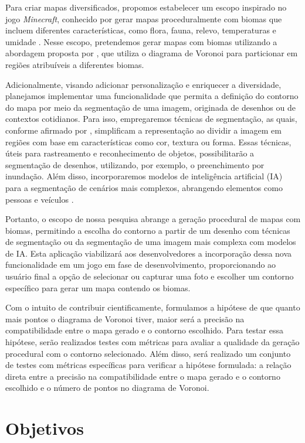 Para criar mapas diversificados, propomos estabelecer um escopo inspirado no jogo \textit{Minecraft}, conhecido por gerar mapas proceduralmente com biomas que incluem diferentes características, como flora, fauna, relevo, temperaturas e umidade \cite{mojang}. Nesse escopo, pretendemos gerar mapas com biomas utilizando a abordagem proposta por , que utiliza o diagrama de Voronoi para particionar em regiões atribuíveis a diferentes biomas.

Adicionalmente, visando adicionar personalização e enriquecer a diversidade, planejamos implementar uma funcionalidade que permita a definição do contorno do mapa por meio da segmentação de uma imagem, originada de desenhos ou de contextos cotidianos. Para isso, empregaremos técnicas de segmentação, as quais, conforme afirmado por , simplificam a representação ao dividir a imagem em regiões com base em características como cor, textura ou forma. Essas técnicas, úteis para rastreamento e reconhecimento de objetos, possibilitarão a segmentação de desenhos, utilizando, por exemplo, o preenchimento por inundação. Além disso, incorporaremos modelos de inteligência artificial (IA) para a segmentação de cenários mais complexos, abrangendo elementos como pessoas e veículos \cite{saiwa, OpenCVFloodFill, dp_semantic_segmantation}.

Portanto, o escopo de nossa pesquisa abrange a geração procedural de mapas com biomas, permitindo a escolha do contorno a partir de um desenho com técnicas de segmentação ou da segmentação de uma imagem mais complexa com modelos de IA. Esta aplicação viabilizará aos desenvolvedores a incorporação dessa nova funcionalidade em um jogo em fase de desenvolvimento, proporcionando ao usuário final a opção de selecionar ou capturar uma foto e escolher um contorno específico para gerar um mapa contendo os biomas.

Com o intuito de contribuir cientificamente, formulamos a hipótese de que quanto mais pontos o diagrama de Voronoi tiver, maior será a precisão na compatibilidade entre o mapa gerado e o contorno escolhido. Para testar essa hipótese, serão realizados testes com métricas para avaliar a qualidade da geração procedural com o contorno selecionado. Além disso, será realizado um conjunto de testes com métricas específicas para verificar a hipótese formulada: a relação direta entre a precisão na compatibilidade entre o mapa gerado e o contorno escolhido e o número de pontos no diagrama de Voronoi.

\section{Objetivos}

